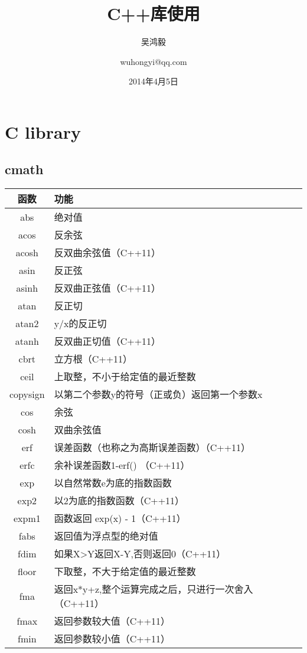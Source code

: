 \documentclass[11pt,a4paper,titlepage]{book}
\title{C++库使用}
\author{\kai 吴鸿毅 \and wuhongyi@qq.com}
\date{2014年4月5日}
\begin{document}
\maketitle%
\tableofcontents%
\newpage%

\chapter{C library}
\section{cmath}
\begin{supertabular}{cl}
\hline
函数& 功能\\
\hline
abs& 绝对值\\
acos& 反余弦\\
acosh& 反双曲余弦值（C++11）\\
asin& 反正弦\\
asinh& 反双曲正弦值（C++11）\\
atan& 反正切\\
atan2& y/x的反正切\\
atanh& 反双曲正切值（C++11）\\
cbrt& 立方根（C++11）\\
ceil& 上取整，不小于给定值的最近整数\\
copysign& 以第二个参数y的符号（正或负）返回第一个参数x\\
cos& 余弦\\
cosh& 双曲余弦值\\
erf& 误差函数（也称之为高斯误差函数）（C++11）\\
erfc& 余补误差函数1-erf() （C++11）\\
exp& 以自然常数e为底的指数函数\\
exp2& 以2为底的指数函数（C++11）\\
expm1& 函数返回 exp(x) - 1（C++11）\\
fabs& 返回值为浮点型的绝对值\\
fdim& 如果X>Y返回X-Y,否则返回0（C++11）\\
floor& 下取整，不大于给定值的最近整数\\
fma& 返回x*y+z,整个运算完成之后，只进行一次舍入（C++11）\\
fmax& 返回参数较大值（C++11）\\
fmin& 返回参数较小值（C++11）\\

\end{supertabular}
\end{document}
